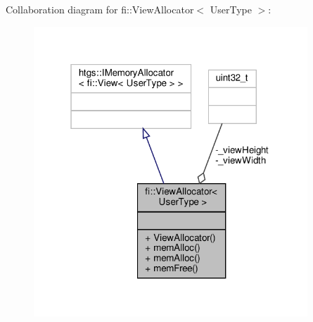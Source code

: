 Collaboration diagram for fi\+:\+:View\+Allocator$<$ User\+Type $>$\+:
\nopagebreak
\begin{figure}[H]
\begin{center}
\leavevmode
\includegraphics[width=292pt]{d6/de0/classfi_1_1ViewAllocator__coll__graph}
\end{center}
\end{figure}
